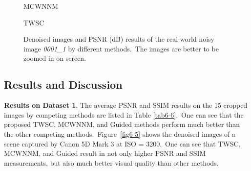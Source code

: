 \begin{figure}[ht!]
{\begin{minipage}[t]{0.19\textwidth}
{\footnotesize MCWNNM}
\end{minipage}
\begin{minipage}[t]{0.19\textwidth}
\centering
{}
{\footnotesize TWSC}
\end{minipage}
}
    \caption{Denoised images and PSNR (dB) results of the real-world noisy image \textsl{0001\_1} \cite{dnd2017} by different methods.\ The images are better to be zoomed in on screen.}
    \label{fig6-6}
\end{figure}


\subsection{Results and Discussion}

\textbf{Results on Dataset 1}. The average PSNR and SSIM results on the 15 cropped images by competing methods are listed in Table \ref{tab6-6}.\ One can see that the proposed TWSC, MCWNNM, and Guided methods perform much better than the other competing methods.\ Figure\ \ref{fig6-5} shows the denoised images of a scene captured by Canon 5D Mark 3 at ISO = 3200.\ One can see that TWSC, MCWNNM, and Guided result in not only higher PSNR and SSIM measurements, but also much better visual quality than other methods.

